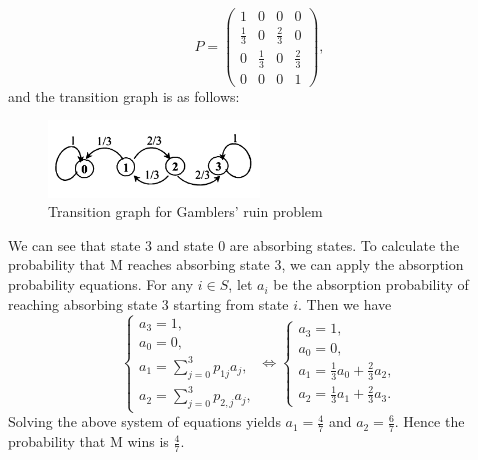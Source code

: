\documentclass[12pt,letterpaper, onecolumn]{exam}
\begin{document}
\begin{questions}
\begin{solution}
            $$
            P=\begin{pmatrix}
               1&0&0&0\\
                \frac{1}{3}&0&\frac{2}{3}&0\\
                0&\frac{1}{3}&0&\frac{2}{3}\\
                0&0&0&1 
            \end{pmatrix},
            $$
            and the transition graph is as follows:
            \begin{figure}[H]
                \centering
                \includegraphics[width=0.5\textwidth]{figures/fig-3.png} %
                \caption{Transition graph for Gamblers' ruin problem}
            \end{figure}
            We can see that state $3$ and state $0$ are absorbing states. To calculate the probability that M reaches absorbing state $3$, we can apply the absorption probability equations. For any $i\in S$, let $a_i$ be the absorption probability of reaching absorbing state $3$ starting from state $i$. Then we have
            $$
            \begin{cases}
                a_3=1,\\
                a_0=0,\\
                a_1=\sum\limits_{j=0}^3p_{1j}a_j,\\
                a_2=\sum\limits_{j=0}^3p_{2,j}a_j,
            \end{cases}\Leftrightarrow\begin{cases}
                a_3=1,\\
                a_0=0,\\
                a_1=\frac{1}{3}a_0+\frac{2}{3}a_2,\\
                a_2=\frac{1}{3}a_1+\frac{2}{3}a_3.
            \end{cases}
            $$
            Solving the above system of equations yields $a_1=\frac{4}{7}$ and $a_2=\frac{6}{7}$. Hence the probability that M wins is $\frac{4}{7}$.
        \end{solution}


\end{questions}
\end{document}
